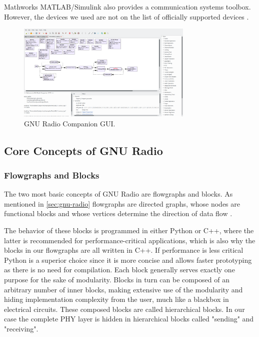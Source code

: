 Mathworks MATLAB/Simulink also provides a communication systems toolbox. However, the devices we used are not on the list of officially supported devices \cite{Matlab}.

\begin{figure}[t]
	\label{fig:gnuradio}
	\begin{center}
		\includegraphics[width=0.75\textwidth,valign=c]{pictures/grc_ui}
	\end{center}
	\caption{GNU Radio Companion GUI.}
\end{figure}

\subsection{Core Concepts of GNU Radio}

\subsubsection{Flowgraphs and Blocks}
\label{sec:flowgraphs}
The two most basic concepts of GNU Radio are flowgraphs and blocks. As mentioned in \ref{sec:gnu-radio} flowgraphs are directed graphs, whose nodes are functional blocks and whose vertices determine the direction of data flow \cite{GR1}. 

The behavior of these blocks is programmed in either Python or C++, where the latter is recommended for performance-critical applications, which is also why the blocks in our flowgraphs are all written in C++. If performance is less critical Python is a superior choice since it is more concise and allows faster prototyping as there is no need for compilation. Each block generally serves exactly one purpose for the sake of modularity. Blocks in turn can be composed of an arbitrary number of inner blocks, making extensive use of the modularity and hiding implementation complexity from the user, much like a blackbox in electrical circuits. These composed blocks are called hierarchical blocks. In our case the complete PHY layer is hidden in hierarchical blocks called "sending" and "receiving".

